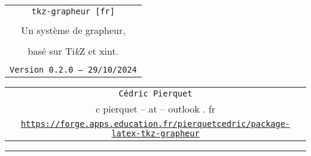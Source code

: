 \documentclass[11pt,a4paper]{ltxdoc}
\providecommand\tikzlogo{Ti\textit{k}Z}
\let\TikZ\tikzlogo
\def\TPversion{0.2.0}
\def\TPdate{29/10/2024}
\begin{document}
\pagestyle{fancy}

\thispagestyle{empty}

\begin{center}
	\begin{minipage}{0.88\linewidth}
	\begin{tcolorbox}[colframe=yellow,colback=yellow!15]
		\begin{center}
			\begin{tabular}{c}
				{\Huge \texttt{tkz-grapheur [fr]}}\\
				\\
				{\LARGE Un système de grapheur,}\\
				\\
				{\LARGE basé sur \textsf{\TikZ} et \textsf{xint}.}\\
				\\
				{\small \texttt{Version \TPversion{} -- \TPdate}}
		\end{tabular}
		\end{center}
	\end{tcolorbox}
\end{minipage}
\end{center}

\begin{center}
	\begin{tabular}{c}
	\texttt{Cédric Pierquet}\\
	{\ttfamily c pierquet -- at -- outlook . fr}\\
	\texttt{\url{https://forge.apps.education.fr/pierquetcedric/package-latex-tkz-grapheur}} \\
\end{tabular}
\end{center}

\hrule

\vfill
\end{document}

